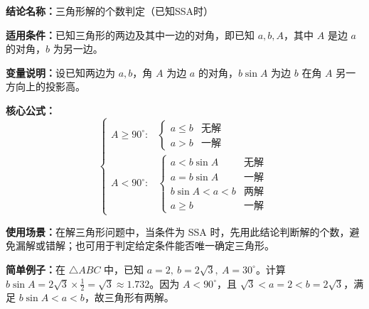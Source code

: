\textbf{结论名称：}三角形解的个数判定（已知SSA时）

\textbf{适用条件：}已知三角形的两边及其中一边的对角，即已知 \(a,b,A\)，其中 \(A\) 是边 \(a\) 的对角，\(b\) 为另一边。

\textbf{变量说明：}设已知两边为 \(a,b\)，角 \(A\) 为边 \(a\) 的对角，\(b\sin A\) 为边 \(b\) 在角 \(A\) 另一方向上的投影高。

\textbf{核心公式：}
\[
\boxed{
\begin{cases}
A \geq 90^\circ : & \begin{cases}
a \leq b & \text{无解} \\
a > b & \text{一解}
\end{cases} \\[10pt]
A < 90^\circ : & \begin{cases}
a < b\sin A & \text{无解} \\
a = b\sin A & \text{一解} \\
b\sin A < a < b & \text{两解} \\
a \geq b & \text{一解}
\end{cases}
\end{cases}
}
\]

\textbf{使用场景：}在解三角形问题中，当条件为 SSA 时，先用此结论判断解的个数，避免漏解或错解；也可用于判定给定条件能否唯一确定三角形。

\textbf{简单例子：}在 \(\triangle ABC\) 中，已知 \(a=2,\ b=2\sqrt3,\ A=30^\circ\)。计算 \(b\sin A = 2\sqrt3 \times \frac12 = \sqrt3 \approx 1.732\)。因为 \(A<90^\circ\)，且 \(\sqrt3 < a=2 < b=2\sqrt3\)，满足 \(b\sin A < a < b\)，故三角形有两解。